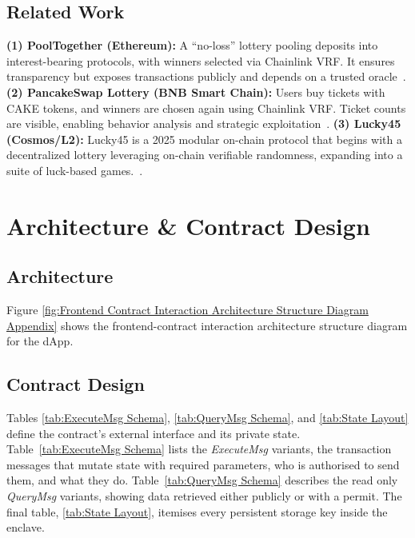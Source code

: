 \documentclass{article}
\begin{document}
\subsection{Related Work}
\textbf{(1) PoolTogether (Ethereum):} A ``no-loss'' lottery pooling deposits into interest-bearing protocols, with winners selected via Chainlink VRF. It ensures transparency but exposes transactions publicly and depends on a trusted oracle~\cite{PoolTogether}. \textbf{(2) PancakeSwap Lottery (BNB Smart Chain):} Users buy tickets with CAKE tokens, and winners are chosen again using Chainlink VRF. Ticket counts are visible, enabling behavior analysis and strategic exploitation~\cite{PancakeSwap}. \textbf{(3) Lucky45 (Cosmos/L2):} Lucky45 is a 2025 modular on-chain protocol that begins with a decentralized lottery leveraging on-chain verifiable randomness, expanding into a suite of luck-based games.~\cite{Lucky45}.

\section{Architecture \& Contract Design}

\subsection{Architecture}
Figure \ref{fig:Frontend Contract Interaction Architecture Structure Diagram Appendix} shows the frontend-contract interaction architecture structure diagram for the dApp.

\subsection{Contract Design}

Tables \ref{tab:ExecuteMsg Schema}, \ref{tab:QueryMsg Schema}, and \ref{tab:State Layout} define the contract's external interface and its private state. Table~\ref{tab:ExecuteMsg Schema} lists the \emph{ExecuteMsg} variants, the transaction messages that mutate state with required parameters, who is authorised to send them, and what they do. Table~\ref{tab:QueryMsg Schema} describes the read only \emph{QueryMsg} variants, showing data retrieved either publicly or with a permit. The final table, \ref{tab:State Layout}, itemises every persistent storage key inside the enclave.
\end{document}
